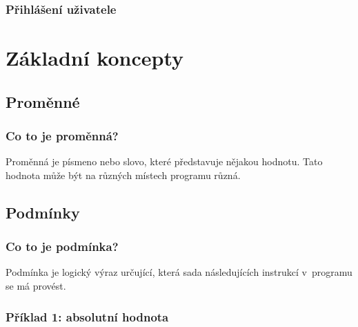 \documentclass[aspectratio=169,11pt,handout]{beamer}
\begin{document}
\begin{frame}
 \frametitle{Přihlášení uživatele}
 \centering
 \begin{minipage}{.8\textwidth}
 \end{minipage}
\end{frame}

\section[Základní koncepty]{Základní koncepty}
\subsection[Proměnné]{Proměnné}

\begin{frame}
 \frametitle{Co to je proměnná?}
 \begin{tcolorbox}[title=Proměnná,center,width=.9\textwidth]
  Proměnná je písmeno nebo slovo, které \alert{představuje nějakou hodnotu}.
  Tato hodnota může být na různých místech programu různá.
 \end{tcolorbox}
\end{frame}

\subsection[Podmínky]{Podmínky}

\begin{frame}
 \frametitle{Co to je podmínka?}
 \begin{tcolorbox}[title=Podmínka,center,width=.9\textwidth]
  Podmínka je \alert{logický výraz} určující, která sada následujících instrukcí
  v~programu se má provést.
 \end{tcolorbox}
\end{frame}

\begin{frame}
 \frametitle{Příklad 1: absolutní hodnota}
 \centering
 \begin{minipage}{.8\textwidth}
  \begin{algorithm}[H]
   \DontPrintSemicolon
   \BlankLine

  \end{algorithm}
 \end{minipage}
\end{frame}
\end{document}
